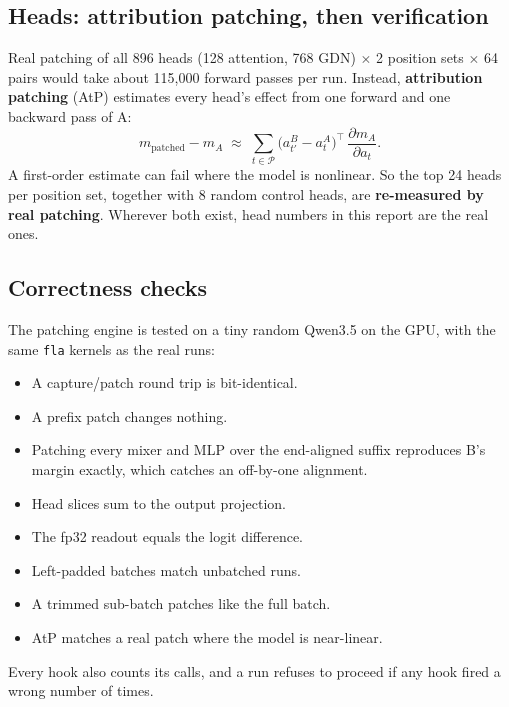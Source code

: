 \documentclass[11pt,a4paper]{article}
\begin{document}
\subsection{Heads: attribution patching, then verification}
Real patching of all 896 heads (128 attention, 768 GDN) $\times$ 2 position sets $\times$ 64 pairs
would take about 115{,}000 forward passes per run. Instead, \textbf{attribution patching} (AtP)
estimates every head's effect from one forward and one backward pass of A:
\begin{equation}
  m_{\text{patched}} - m_A \;\approx\; \sum_{t\in\mathcal P}\bigl(a^{B}_{t'} - a^{A}_{t}\bigr)^{\!\top}\,
  \frac{\partial m_A}{\partial a_t}.
\end{equation}
A first-order estimate can fail where the model is nonlinear. So the top 24 heads per position set,
together with 8 random control heads, are \textbf{re-measured by real patching}. Wherever both exist,
head numbers in this report are the real ones.

\subsection{Correctness checks}
The patching engine is tested on a tiny random Qwen3.5 on the GPU, with the same \texttt{fla}
kernels as the real runs:
\begin{itemize}
  \item A capture/patch round trip is bit-identical.
  \item A prefix patch changes nothing.
  \item Patching every mixer and MLP over the end-aligned suffix reproduces B's margin exactly,
        which catches an off-by-one alignment.
  \item Head slices sum to the output projection.
  \item The fp32 readout equals the logit difference.
  \item Left-padded batches match unbatched runs.
  \item A trimmed sub-batch patches like the full batch.
  \item AtP matches a real patch where the model is near-linear.
\end{itemize}
Every hook also counts its calls, and a run refuses to proceed if any hook fired a wrong number of
times.
\end{document}
